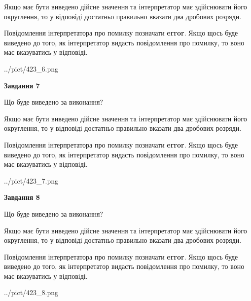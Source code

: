 \documentclass[12pt, ukrainian]{article}
\begin{document}
{\begin {Large}
Якщо має бути виведено дійсне значення та інтерпретатор має здійснювати його округлення, 
то у відповіді достатньо правильно вказати два дробових розряди.

Повідомлення інтерпретатора про помилку позначати \textbf{error}.
Якщо щось буде виведено до того, як інтерпретатор видасть повідомлення про помилку, 
то воно має вказуватись у відповіді. \par

\begin{center}
	{../pict/423_6.png}
\end{center}
\newpage

{\begin {center}\textbf{Завдання 7}\end {center}}\par
Що буде виведено за виконання? \par

Якщо має бути виведено дійсне значення та інтерпретатор має здійснювати його округлення, 
то у відповіді достатньо правильно вказати два дробових розряди.

Повідомлення інтерпретатора про помилку позначати \textbf{error}.
Якщо щось буде виведено до того, як інтерпретатор видасть повідомлення про помилку, 
то воно має вказуватись у відповіді. \par

\begin{center}
	{../pict/423_7.png}
\end{center}
\newpage

{\begin {center}\textbf{Завдання 8}\end {center}}\par
Що буде виведено за виконання? \par

Якщо має бути виведено дійсне значення та інтерпретатор має здійснювати його округлення, 
то у відповіді достатньо правильно вказати два дробових розряди.

Повідомлення інтерпретатора про помилку позначати \textbf{error}.
Якщо щось буде виведено до того, як інтерпретатор видасть повідомлення про помилку, 
то воно має вказуватись у відповіді. \par

\begin{center}
	{../pict/423_8.png}
\end{center}
\newpage


\end{Large}}
\end{document}
